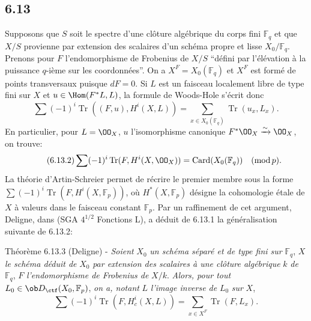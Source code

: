 \subsection*{6.13}
Supposons que $S$ soit le spectre d'une clôture algébrique du corps fini $\mathbb{F}_q$ et que $X/S$ provienne par extension des scalaires d'un schéma propre et lisse $X_0/\mathbb{F}_q$. Prenons pour $F$ l'endomorphisme de Frobenius de $X/S$ ``défini par l'élévation à la puissance $q$-ième sur les coordonnées''. On a $X^F=X_0(\mathbb{F}_q)$ et $X^F$ est formé de points transversaux puisque $dF=0$. Si $L$ est un faisceau localement libre de type fini sur $X$ et $u\in\Hom(F^*L,L)$, la formule de Woods-Hole s'écrit donc
\begin{equation}
\tag{6.13.1}
\sum(-1)^i\operatorname{Tr}((F,u),H^i(X,L))=
\sum_{x\in X_0(\mathbb{F}_q)}\operatorname{Tr}(u_x,L_x).
\end{equation}
En particulier, pour $L=\OO_X$, $u$ l'isomorphisme canonique $F^*\OO_X\xrightarrow{\sim}\OO_X$, on trouve:
\begin{equation}
\tag{6.13.2}
\sum(-1)^i\operatorname{Tr}(F,H^i(X,\OO_X))=\operatorname{Card}(X_0(\mathbb{F}_q))\quad(\operatorname{mod} p).
\end{equation}
La théorie d'Artin-Schreier permet de récrire le premier membre sous la forme $\sum(-1)^i\operatorname{Tr}(F,H^i(X,\mathbb{F}_p))$, où $H^*(X,\mathbb{F}_p)$ désigne la cohomologie étale de $X$ à valeurs dans le faisceau constant $\mathbb{F}_p$. Par un raffinement de cet argument, Deligne, dans (SGA $4^{1/2}$ Fonctions L), a déduit de 6.13.1 la généralisation suivante de 6.13.2:


\begin{statement}{Théorème 6.13.3 (Deligne) -}
\emph{Soient} $X_0$ \emph{un schéma séparé et de type fini sur} $\mathbb{F}_q$, $X$ \emph{le schéma déduit de} $X_0$ \emph{par extension des scalaires à une clôture algébrique} $k$ \emph{de} $\mathbb{F}_q$, $F$ \emph{l'endomorphisme de Frobenius de} $X/k$. \emph{Alors, pour tout} $L_0\in\ob D_{\ctf}(X_0,\mathbb{F}_p)$, \emph{on a, notant} $L$ \emph{l'image inverse de} $L_0$ \emph{sur} $X$,
\[
\sum(-1)^i\operatorname{Tr}(F,H_c^i(X,L))=
\sum_{x\in X^F}\operatorname{Tr}(F,L_x).
\]
\end{statement}

